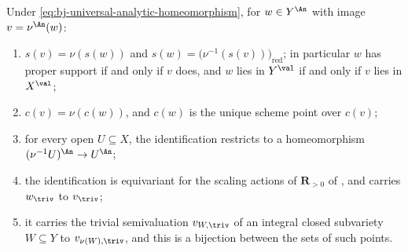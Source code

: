 \begin{lemma}
\label{lem:ch43-identification-dictionary}
Under \eqref{eq:bj-universal-analytic-homeomorphism}, for
$w\in Y^{\An}$ with image $v=\nu^{\An}(w)$:
\begin{enumerate}
\item\label{itm:ch43-id:supp}
      $s(v)=\nu(s(w))$ and $s(w)=\bigl(\nu^{-1}(s(v))\bigr)_{\mathrm{red}}$;
      in particular $w$ has
      proper support if and only if $v$ does, and $w$ lies in
      $Y^{\val}$ if and only if $v$ lies in $X^{\val}$;
\item\label{itm:ch43-id:centre}
      $c(v)=\nu(c(w))$, and $c(w)$ is the unique scheme point
      over $c(v)$;
\item\label{itm:ch43-id:open}
      for every open $U\subseteq X$, the identification restricts to a
      homeomorphism $(\nu^{-1}U)^{\An}\to U^{\An}$;
\item\label{itm:ch43-id:scaling}
      the identification is equivariant for the scaling actions of
      $\mathbf R_{>0}$ of , and carries
      $w_\triv$ to $v_\triv$;
\item\label{itm:ch43-id:trivial}
      it carries the trivial semivaluation $v_{W,\triv}$ of an integral
      closed subvariety $W\subseteq Y$ to $v_{\nu(W),\triv}$, and this
      is a bijection between the sets of such points.
\end{enumerate}
\end{lemma}

